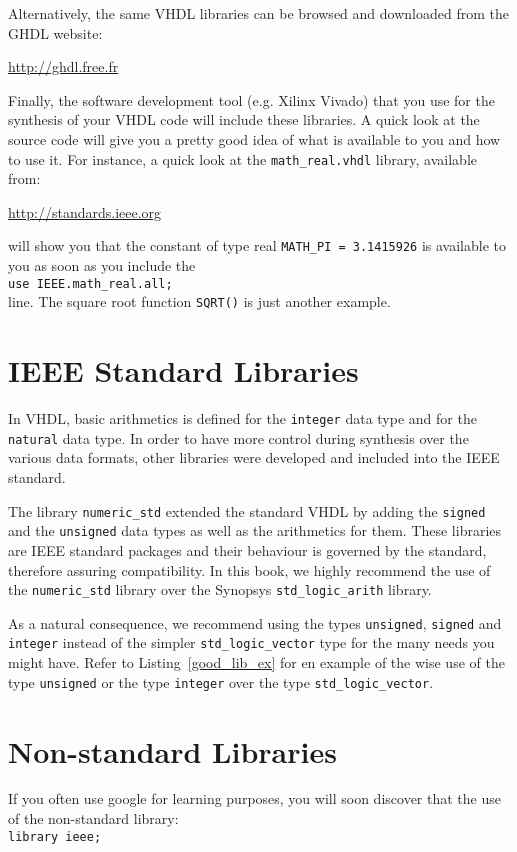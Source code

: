 \noindent
Alternatively, the same VHDL libraries can be browsed and downloaded from the GHDL website:

\noindent
\url{http://ghdl.free.fr}

\noindent
Finally, the software development tool (e.g. Xilinx Vivado) that you use for the synthesis of your VHDL code will include these libraries. A quick look at the source code will give you a pretty good idea of what is available to you and how to use it. For instance, a quick look at the \texttt{math\_real.vhdl} library, available from:

\noindent
\url{http://standards.ieee.org}

\noindent
will show you that the constant of type real \texttt{MATH\_PI = 3.1415926} is available to you as soon as you include the \\
\texttt{use IEEE.math\_real.all;} \\
line. The square root function \texttt{SQRT()} is just another example.

\section{IEEE Standard Libraries}
In VHDL, basic arithmetics is defined for the \texttt{integer} data type and for the \texttt{natural} data type. In order to have more control during synthesis over the various data formats, other libraries were developed and included into the IEEE standard.

The library \texttt{numeric\_std} extended the standard VHDL by adding the \texttt{signed} and the \texttt{unsigned} data types as well as the arithmetics for them. These libraries are IEEE standard packages and their behaviour is governed by the standard, therefore assuring compatibility. In this book, we highly recommend the use of the \texttt{numeric\_std} library over the Synopsys \texttt{std\_logic\_arith} library.

As a natural consequence, we recommend using the types \texttt{unsigned}, \texttt{signed} and \texttt{integer} instead of the simpler \texttt{std\_logic\_vector} type for the many needs you might have. Refer to Listing~\ref{good_lib_ex} for en example of the wise use of the type \texttt{unsigned} or the type \texttt{integer} over the type \texttt{std\_logic\_vector}.

\section{Non-standard Libraries}
If {you often use google for learning purposes}, you will soon discover that the use of the non-standard library:\\
\texttt{library ieee;}

